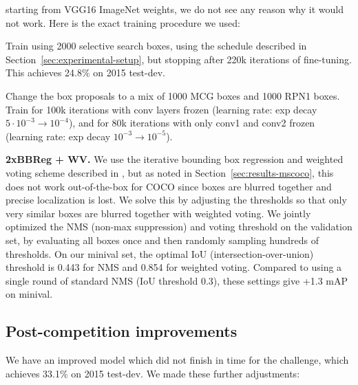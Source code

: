 \documentclass[10pt,twocolumn,letterpaper]{article}
\begin{document}
\begin{packed_enum}
  starting from VGG16 ImageNet weights, we do not see any reason why it would not
  work.  Here is the exact training procedure we used:
  \begin{packed_enum}
    \item Train using 2000 selective search boxes, using the schedule described
      in Section~\ref{sec:experimental-setup}, but stopping after 220k iterations
      of fine-tuning.  This achieves 24.8\% on 2015 test-dev.
    \item Change the box proposals to a mix of 1000 MCG boxes and 1000 RPN1
      boxes.  Train for 100k iterations with conv layers frozen (learning rate: exp decay
      $5 \cdot 10^{-3} \rightarrow 10^{-4}$), and for 80k iterations with
      only conv1 and conv2 frozen (learning rate: exp decay $10^{-3} \rightarrow 10^{-5}$).
  \end{packed_enum}
  \item \textbf{2xBBReg + WV.}  We use the iterative bounding box regression and
    weighted voting scheme described in \cite{MR-CNN}, but as noted in
    Section~\ref{sec:results-mscoco}, this does not work out-of-the-box for COCO
    since boxes are blurred together and precise localization is lost.  We solve
    this by adjusting the thresholds so that only very similar boxes are blurred
    together with weighted voting.  We jointly optimized the NMS (non-max
    suppression) and voting threshold on the validation set, by evaluating all
    boxes once and then randomly sampling hundreds of thresholds.  On our
    minival set, the optimal IoU (intersection-over-union) threshold is 0.443
    for NMS and 0.854 for weighted voting.  Compared to using a single round of
    standard NMS (IoU threshold 0.3), these settings give +1.3 mAP on minival.
\end{packed_enum}\subsection*{Post-competition improvements}
We have an improved model which did not finish in time for the challenge, which
achieves 33.1\% on 2015 test-dev.  We made these further adjustments:
\end{document}
